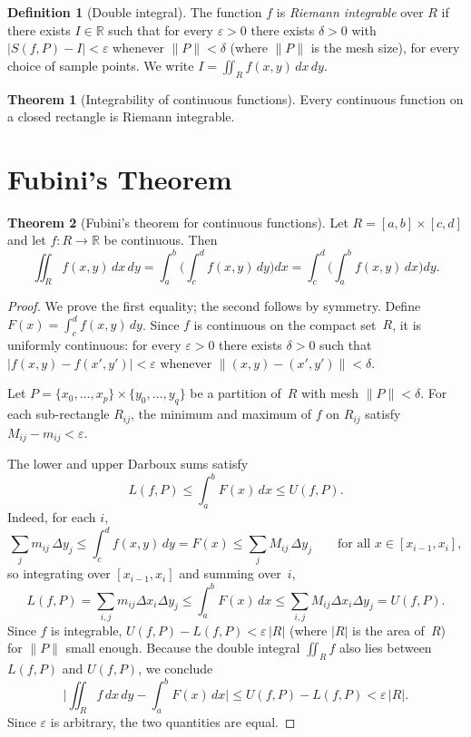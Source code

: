 \documentclass[12pt,a4paper]{book}
\theoremstyle{definition}
\newtheorem{definition}{Definition}[chapter]
\newtheorem{theorem}{Theorem}[chapter]
\begin{document}
\begin{definition}[Double integral]\label{def:double-integral}
The function $f$ is \emph{Riemann integrable} over $R$ if there exists
$I\in\mathbb{R}$ such that for every $\varepsilon>0$ there exists $\delta>0$
with $|S(f,P)-I|<\varepsilon$ whenever $\|P\|<\delta$ (where $\|P\|$ is the
mesh size), for every choice of sample points.  We write
$I=\iint_R f(x,y)\,dx\,dy$.
\end{definition}

\begin{theorem}[Integrability of continuous functions]
\label{thm:continuous-integrable}
Every continuous function on a closed rectangle is Riemann integrable.
\end{theorem}

\section{Fubini's Theorem}
\label{sec:fubini}

\begin{theorem}[Fubini's theorem for continuous functions]
\label{thm:fubini}
Let $R=[a,b]\times[c,d]$ and let $f\colon R\to\mathbb{R}$ be continuous.
Then
\[
  \iint_R f(x,y)\,dx\,dy
  = \int_a^b\!\biggl(\int_c^d f(x,y)\,dy\biggr)dx
  = \int_c^d\!\biggl(\int_a^b f(x,y)\,dx\biggr)dy.
\]
\end{theorem}

\begin{proof}
We prove the first equality; the second follows by symmetry.  Define
$F(x)=\int_c^d f(x,y)\,dy$.  Since $f$ is continuous on the compact set~$R$,
it is uniformly continuous: for every $\varepsilon>0$ there exists $\delta>0$
such that $|f(x,y)-f(x',y')|<\varepsilon$ whenever
$\|(x,y)-(x',y')\|<\delta$.

Let $P=\{x_0,\dots,x_p\}\times\{y_0,\dots,y_q\}$ be a partition of~$R$ with
mesh $\|P\|<\delta$.  For each sub-rectangle $R_{ij}$, the minimum and maximum
of $f$ on $R_{ij}$ satisfy $M_{ij}-m_{ij}<\varepsilon$.

The lower and upper Darboux sums satisfy
\[
  L(f,P) \le \int_a^b F(x)\,dx \le U(f,P).
\]
Indeed, for each $i$,
\[
  \sum_j m_{ij}\,\Delta y_j
  \le \int_c^d f(x,y)\,dy = F(x)
  \le \sum_j M_{ij}\,\Delta y_j
  \qquad\text{for all }x\in[x_{i-1},x_i],
\]
so integrating over $[x_{i-1},x_i]$ and summing over~$i$,
\[
  L(f,P) = \sum_{i,j}m_{ij}\Delta x_i\Delta y_j
  \le \int_a^b F(x)\,dx
  \le \sum_{i,j}M_{ij}\Delta x_i\Delta y_j = U(f,P).
\]
Since $f$ is integrable, $U(f,P)-L(f,P)<\varepsilon\,|R|$ (where $|R|$
is the area of~$R$) for $\|P\|$ small enough.  Because the double integral
$\iint_R f$ also lies between $L(f,P)$ and $U(f,P)$, we conclude
\[
  \biggl|\iint_R f\,dx\,dy - \int_a^b F(x)\,dx\biggr|
  \le U(f,P)-L(f,P)<\varepsilon\,|R|.
\]
Since $\varepsilon$ is arbitrary, the two quantities are equal.
\end{proof}
\end{document}
